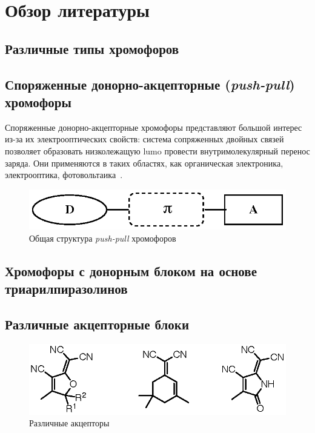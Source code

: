 \section{Обзор литературы}

\subsection{Различные типы хромофоров}

\subsection{Споряженные донорно-акцепторные (\emph{push-pull}) хромофоры}

Споряженные донорно-акцепторные хромофоры представляют большой интерес из-за их электрооптических свойств: система сопряженных двойных связей позволяет образовать низколежащую \ac{lumo} провести внутримолекулярный перенос заряда. Они применяются в таких областях, как органическая электроника, электрооптика, фотовольтаика~\cite{Bures2014a}.

\begin{figure}
    \centering
    \includegraphics{sections/literature/img/D-p-A_chromophores.eps}
    \caption{Общая структура \emph{push-pull} хромофоров}
\end{figure}

\subsection{Хромофоры с донорным блоком на основе триарилпиразолинов}

\subsection{Различные акцепторные блоки}

\begin{figure}
    \centering
    \includegraphics{sections/literature/img/acceptors.eps}
    \caption{Различные акцепторы~\cite{Dalton2010a}}
\end{figure}

